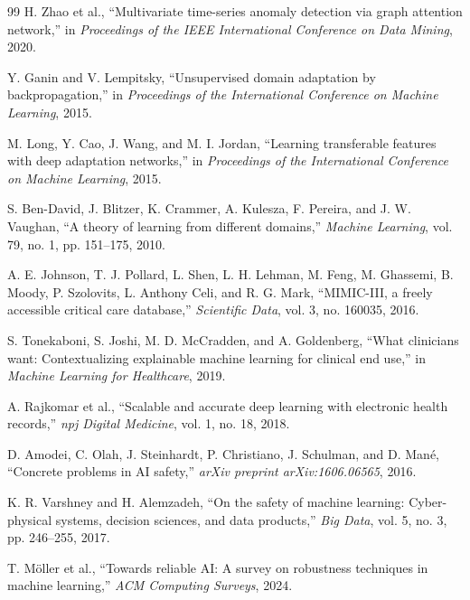 \documentclass[10pt,conference]{IEEEtran}
\begin{document}
\begin{thebibliography}{99}
H. Zhao et al., ``Multivariate time-series anomaly detection via graph
attention network,'' in \emph{Proceedings of the IEEE International
Conference on Data Mining}, 2020.

Y. Ganin and V. Lempitsky, ``Unsupervised domain adaptation by
backpropagation,'' in \emph{Proceedings of the International Conference
on Machine Learning}, 2015.

M. Long, Y. Cao, J. Wang, and M. I. Jordan, ``Learning transferable
features with deep adaptation networks,'' in \emph{Proceedings of the
International Conference on Machine Learning}, 2015.

S. Ben-David, J. Blitzer, K. Crammer, A. Kulesza, F. Pereira, and
J. W. Vaughan, ``A theory of learning from different domains,''
\emph{Machine Learning}, vol. 79, no. 1, pp. 151--175, 2010.

A. E. Johnson, T. J. Pollard, L. Shen, L. H. Lehman, M. Feng,
M. Ghassemi, B. Moody, P. Szolovits, L. Anthony Celi, and R. G. Mark,
``MIMIC-III, a freely accessible critical care database,''
\emph{Scientific Data}, vol. 3, no. 160035, 2016.

S. Tonekaboni, S. Joshi, M. D. McCradden, and A. Goldenberg, ``What
clinicians want: Contextualizing explainable machine learning for clinical
end use,'' in \emph{Machine Learning for Healthcare}, 2019.

A. Rajkomar et al., ``Scalable and accurate deep learning with electronic
health records,'' \emph{npj Digital Medicine}, vol. 1, no. 18, 2018.

D. Amodei, C. Olah, J. Steinhardt, P. Christiano, J. Schulman, and
D. Man\'e, ``Concrete problems in AI safety,'' \emph{arXiv preprint
arXiv:1606.06565}, 2016.

K. R. Varshney and H. Alemzadeh, ``On the safety of machine learning:
Cyber-physical systems, decision sciences, and data products,'' \emph{Big
Data}, vol. 5, no. 3, pp. 246--255, 2017.

T. M\"oller et al., ``Towards reliable AI: A survey on robustness
techniques in machine learning,'' \emph{ACM Computing Surveys}, 2024.

\end{thebibliography}
\end{document}
